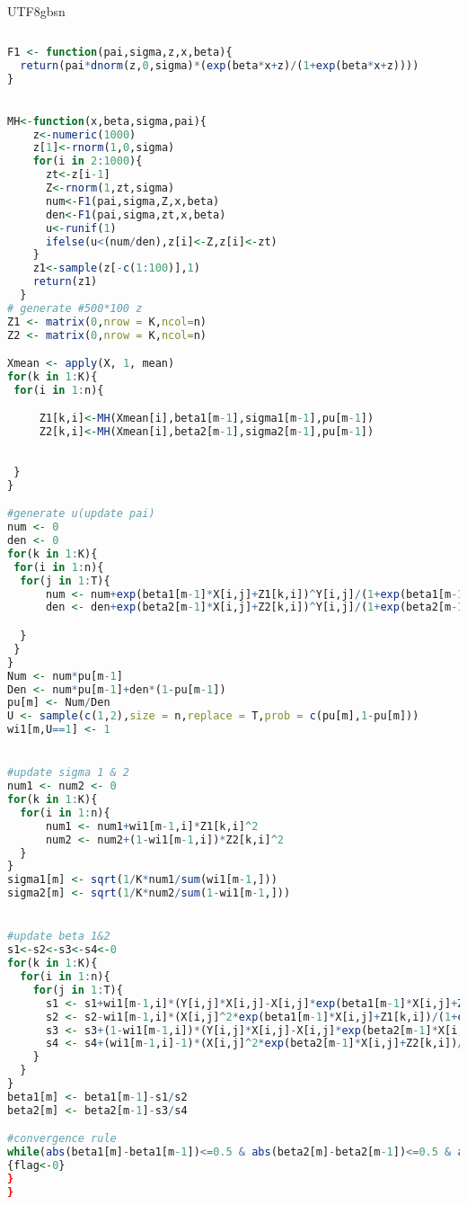 \documentclass[10pt]{article}
\begin{document}
\begin{CJK}{UTF8}{gbsn}
\begin{lstlisting}[language=R]
  
F1 <- function(pai,sigma,z,x,beta){
  return(pai*dnorm(z,0,sigma)*(exp(beta*x+z)/(1+exp(beta*x+z))))
}
  

MH<-function(x,beta,sigma,pai){
    z<-numeric(1000)
    z[1]<-rnorm(1,0,sigma)
    for(i in 2:1000){
      zt<-z[i-1]
      Z<-rnorm(1,zt,sigma)
      num<-F1(pai,sigma,Z,x,beta)
      den<-F1(pai,sigma,zt,x,beta)
      u<-runif(1)
      ifelse(u<(num/den),z[i]<-Z,z[i]<-zt)
    }
    z1<-sample(z[-c(1:100)],1)
    return(z1)
  }
# generate #500*100 z
Z1 <- matrix(0,nrow = K,ncol=n)
Z2 <- matrix(0,nrow = K,ncol=n)

Xmean <- apply(X, 1, mean)
for(k in 1:K){
 for(i in 1:n){

     Z1[k,i]<-MH(Xmean[i],beta1[m-1],sigma1[m-1],pu[m-1])
     Z2[k,i]<-MH(Xmean[i],beta2[m-1],sigma2[m-1],pu[m-1])
  
   
 }
}

#generate u(update pai)
num <- 0
den <- 0
for(k in 1:K){
 for(i in 1:n){
  for(j in 1:T){
      num <- num+exp(beta1[m-1]*X[i,j]+Z1[k,i])^Y[i,j]/(1+exp(beta1[m-1]*X[i,j]+Z1[k,i]))
      den <- den+exp(beta2[m-1]*X[i,j]+Z2[k,i])^Y[i,j]/(1+exp(beta2[m-1]*X[i,j]+Z2[k,i]))

  }
 }
}
Num <- num*pu[m-1] 
Den <- num*pu[m-1]+den*(1-pu[m-1])
pu[m] <- Num/Den
U <- sample(c(1,2),size = n,replace = T,prob = c(pu[m],1-pu[m]))
wi1[m,U==1] <- 1


#update sigma 1 & 2
num1 <- num2 <- 0
for(k in 1:K){
  for(i in 1:n){
      num1 <- num1+wi1[m-1,i]*Z1[k,i]^2
      num2 <- num2+(1-wi1[m-1,i])*Z2[k,i]^2
  }
}
sigma1[m] <- sqrt(1/K*num1/sum(wi1[m-1,]))
sigma2[m] <- sqrt(1/K*num2/sum(1-wi1[m-1,]))


#update beta 1&2
s1<-s2<-s3<-s4<-0
for(k in 1:K){
  for(i in 1:n){
    for(j in 1:T){
      s1 <- s1+wi1[m-1,i]*(Y[i,j]*X[i,j]-X[i,j]*exp(beta1[m-1]*X[i,j]+Z1[k,i])/(1+exp(beta1[m-1]*X[i,j]+Z1[k,i])))
      s2 <- s2-wi1[m-1,i]*(X[i,j]^2*exp(beta1[m-1]*X[i,j]+Z1[k,i])/(1+exp(beta1[m-1]*X[i,j]+Z1[k,i]))^2)
      s3 <- s3+(1-wi1[m-1,i])*(Y[i,j]*X[i,j]-X[i,j]*exp(beta2[m-1]*X[i,j]+Z2[k,i])/(1+exp(beta2[m-1]*X[i,j]+Z2[k,i])))
      s4 <- s4+(wi1[m-1,i]-1)*(X[i,j]^2*exp(beta2[m-1]*X[i,j]+Z2[k,i])/(1+exp(beta2[m-1]*X[i,j]+Z2[k,i]))^2)
    }
  }
}
beta1[m] <- beta1[m-1]-s1/s2
beta2[m] <- beta2[m-1]-s3/s4

#convergence rule
while(abs(beta1[m]-beta1[m-1])<=0.5 & abs(beta2[m]-beta2[m-1])<=0.5 & abs(sigma1[m]-sigma1[m-1])<=0.5 & abs(pu[m]-pu[m-1])<=0.5)
{flag<-0}
}
}
\end{lstlisting}





\end{CJK}
\end{document}
